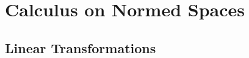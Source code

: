 \documentclass[crop=false,class=article,oneside]{standalone}
\begin{document}
    \ifx\ifworkmasterswork\undefined
        \section*{Calculus on Normed Spaces}
        \setcounter{section}{1}
    \fi
    \subsection{Linear Transformations}
\end{document}

